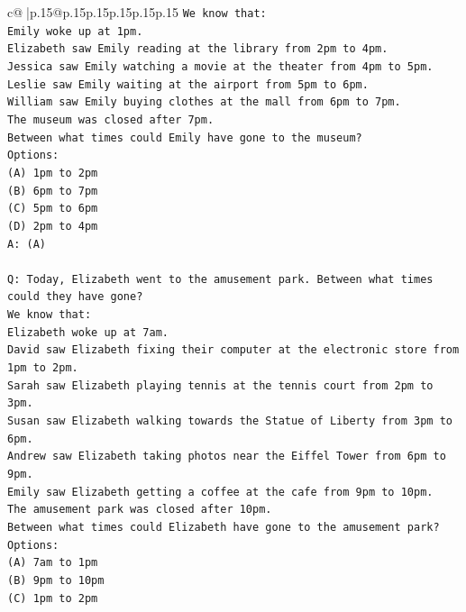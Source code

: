 \documentclass{article}
\begin{document}
{\begin{supertabular}{c@{$\;$}|p{.15\linewidth}@{}p{.15\linewidth}p{.15\linewidth}p{.15\linewidth}p{.15\linewidth}p{.15\linewidth}}
{{{\texttt{We know that:} \\
\texttt{Emily woke up at 1pm.} \\
\texttt{Elizabeth saw Emily reading at the library from 2pm to 4pm.} \\
\texttt{Jessica saw Emily watching a movie at the theater from 4pm to 5pm.} \\
\texttt{Leslie saw Emily waiting at the airport from 5pm to 6pm.} \\
\texttt{William saw Emily buying clothes at the mall from 6pm to 7pm.} \\
\texttt{The museum was closed after 7pm.} \\
\texttt{Between what times could Emily have gone to the museum?} \\
\texttt{Options:} \\
\texttt{(A) 1pm to 2pm} \\
\texttt{(B) 6pm to 7pm} \\
\texttt{(C) 5pm to 6pm} \\
\texttt{(D) 2pm to 4pm} \\
\texttt{A: (A)} \\
\\ 
\texttt{Q: Today, Elizabeth went to the amusement park. Between what times could they have gone?} \\
\texttt{We know that:} \\
\texttt{Elizabeth woke up at 7am.} \\
\texttt{David saw Elizabeth fixing their computer at the electronic store from 1pm to 2pm.} \\
\texttt{Sarah saw Elizabeth playing tennis at the tennis court from 2pm to 3pm.} \\
\texttt{Susan saw Elizabeth walking towards the Statue of Liberty from 3pm to 6pm.} \\
\texttt{Andrew saw Elizabeth taking photos near the Eiffel Tower from 6pm to 9pm.} \\
\texttt{Emily saw Elizabeth getting a coffee at the cafe from 9pm to 10pm.} \\
\texttt{The amusement park was closed after 10pm.} \\
\texttt{Between what times could Elizabeth have gone to the amusement park?} \\
\texttt{Options:} \\
\texttt{(A) 7am to 1pm} \\
\texttt{(B) 9pm to 10pm} \\
\texttt{(C) 1pm to 2pm} \\
}}}
\end{supertabular}}
\end{document}
